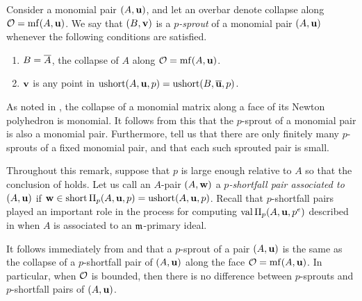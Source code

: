 \documentclass[11pt]{amsart}
\newcommand{\short}{\operatorname{short}}
\newcommand{\ushort}{\operatorname{ushort}}
\begin{document}
\begin{definition}
\label{p-sprout: D}  Consider a monomial pair $(A,\mathbf{u})$, and let an overbar denote collapse along $\mathcal{O} = \operatorname{mf}(A,\mathbf{u})$.
We say that $(B, \mathbf{v})$ is a \emph{$p$-sprout} of a monomial pair $(A, \mathbf{u})$ whenever the following conditions are satisfied.
\begin{enumerate}
\item $B = \overline{A}$, the collapse of $A$ along $\mathcal{O} = \operatorname{mf}(A, \mathbf{u})$.
\item $\mathbf{v}$ is any point in $\ushort(A, \vv{u}, p) = \ushort(B, \ol{\vv{u}}, p)$.
\end{enumerate}
\end{definition}

\begin{remark}
\label{p-sprout: R}
As noted in , the collapse of a monomial matrix along a face of its Newton polyhedron is monomial.  It follows from this that the $p$-sprout of a monomial pair is also a monomial pair.  Furthermore,  tell us that there are only finitely many $p$-sprouts of a fixed monomial pair, and that each such sprouted pair is small.
 \end{remark}

\begin{remark}
\label{sprouts as collapsed shortfall pairs: R}
 Throughout this remark, suppose that $p$ is large enough relative to $A$ so that the conclusion of  holds.  Let us call an $A$-pair $(A,\mathbf{w})$ a \emph{$p$-shortfall pair associated to $(A,\mathbf{u})$} if $\vv{w} \in \short \IP_p(A,\vv{u},p) = \ushort(A,\vv{u},p)$.  Recall that $p$-shortfall pairs played an important role in the process for computing $\operatorname{val} \Pi_p(A,\mathbf{u},p^e)$ described in  when $A$ is associated to an $\mathfrak{m}$-primary ideal.

It follows immediately from  and  that a $p$-sprout of a pair $(A,\mathbf{u})$ is the same as the collapse of a $p$-shortfall pair of $(A,\mathbf{u})$ along the face $\mathcal{O}=\operatorname{mf}(A,\mathbf{u})$.  In particular, when $\mathcal{O}$ is bounded, then there is no difference between $p$-sprouts and $p$-shortfall pairs of $(A,\mathbf{u})$.  
\end{remark}
\end{document}
